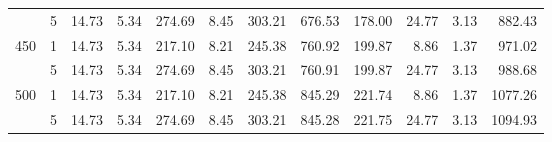 \begin{tabular}{llrrrrrrrrrr}
 & 5 & 14.73 & 5.34 & 274.69 & 8.45 & 303.21 & 676.53 & 178.00 & 24.77 & 3.13 & 882.43 \\
\cline{1-12}
\multirow[t]{2}{*}{450} & 1 & 14.73 & 5.34 & 217.10 & 8.21 & 245.38 & 760.92 & 199.87 & 8.86 & 1.37 & 971.02 \\
 & 5 & 14.73 & 5.34 & 274.69 & 8.45 & 303.21 & 760.91 & 199.87 & 24.77 & 3.13 & 988.68 \\
\cline{1-12}
\multirow[t]{2}{*}{500} & 1 & 14.73 & 5.34 & 217.10 & 8.21 & 245.38 & 845.29 & 221.74 & 8.86 & 1.37 & 1077.26 \\
 & 5 & 14.73 & 5.34 & 274.69 & 8.45 & 303.21 & 845.28 & 221.75 & 24.77 & 3.13 & 1094.93 \\
\cline{1-12}
\bottomrule
\end{tabular}
